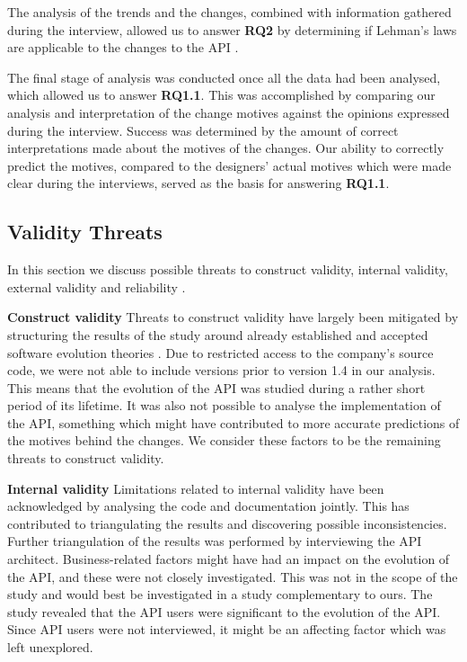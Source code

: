 \documentclass{sig-alternate}
\begin{document}
The analysis of the trends and the changes, combined with information gathered during the interview, allowed us to answer \textbf{RQ2} by determining if Lehman's laws are applicable to the changes to the API \cite{lehman1980programs}.

The final stage of analysis was conducted once all the data had been analysed, which allowed us to answer \textbf{RQ1.1}. This was accomplished by comparing our analysis and interpretation of the change motives against the opinions expressed during the interview. Success was determined by the amount of correct interpretations made about the motives of the changes. Our ability to correctly predict the motives, compared to the designers' actual motives which were made clear during the interviews, served as the basis for answering \textbf{RQ1.1}.


\subsection{Validity Threats} \label{validity_threats} %
In this section we discuss possible threats to construct validity, internal validity, external validity and reliability \cite{runeson2009guidelines}.

\smallskip \noindent
\textbf{Construct validity  } Threats to construct validity have largely been mitigated by structuring the results of the study around already established and accepted software evolution theories \cite{chapin2001types} \cite{lehman1980programs}. Due to restricted access to the company's source code, we were not able to include versions prior to version 1.4 in our analysis. This means that the evolution of the API was studied during a rather short period of its lifetime. It was also not possible to analyse the implementation of the API, something which might have contributed to more accurate predictions of the motives behind the changes. We consider these factors to be the remaining threats to construct validity. 

\smallskip \noindent
\textbf{Internal validity  } Limitations related to internal validity have been acknowledged by analysing the code and documentation jointly. This has contributed to triangulating the results and discovering possible inconsistencies. Further triangulation of the results was performed by interviewing the API architect. Business-related factors might have had an impact on the evolution of the API, and these were not closely investigated. This was not in the scope of the study and would best be investigated in a study complementary to ours. The study revealed that the API users were significant to the evolution of the API. Since API users were not interviewed, it might be an affecting factor which was left unexplored. 
\end{document}

